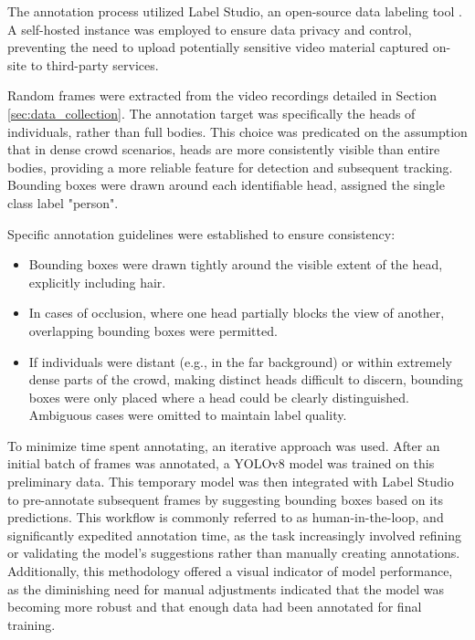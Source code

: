 
The annotation process utilized Label Studio, an open-source data labeling tool \cite{label_studio}. A self-hosted instance was employed to ensure data privacy and control, preventing the need to upload potentially sensitive video material captured on-site to third-party services.

Random frames were extracted from the video recordings detailed in Section \ref{sec:data_collection}. The annotation target was specifically the heads of individuals, rather than full bodies. This choice was predicated on the assumption that in dense crowd scenarios, heads are more consistently visible than entire bodies, providing a more reliable feature for detection and subsequent tracking. Bounding boxes were drawn around each identifiable head, assigned the single class label "person".

Specific annotation guidelines were established to ensure consistency:
\begin{itemize}
  \item Bounding boxes were drawn tightly around the visible extent of the head, explicitly including hair.
  \item In cases of occlusion, where one head partially blocks the view of another, overlapping bounding boxes were permitted.
  \item If individuals were distant (e.g., in the far background) or within extremely dense parts of the crowd, making distinct heads difficult to discern, bounding boxes were only placed where a head could be clearly distinguished. Ambiguous cases were omitted to maintain label quality.
\end{itemize}



To minimize time spent annotating, an iterative approach was used. After an initial batch of frames was annotated, a YOLOv8 model was trained on this preliminary data. This temporary model was then integrated with Label Studio to pre-annotate subsequent frames by suggesting bounding boxes based on its predictions. This workflow is commonly referred to as human-in-the-loop, and significantly expedited annotation time, as the task increasingly involved refining or validating the model's suggestions rather than manually creating annotations. Additionally, this methodology offered a visual indicator of model performance, as the diminishing need for manual adjustments indicated that the model was becoming more robust and that enough data had been annotated for final training.


